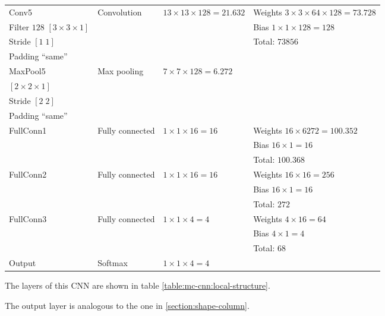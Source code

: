 \begin{table*}
\begin{tabular}{|l|l|l|l|}
                    Conv5 & Convolution & $13\times 13\times 128 = 21.632$ & Weights $3\times 3\times 64 \times 128 = 73.728$\\
                    Filter $128$ $\left[3\times 3\times 1\right]$ & & & Bias $1\times 1\times 128 = 128$\\
                    Stride $\left[1\;1\right]$ & & & Total: $73856$\\
                    Padding ``same'' & & & \\\hline
                    MaxPool5 & Max pooling & $7\times 7\times 128 = 6.272$ & \\
                    $\left[2\times 2\times 1\right]$ & & & \\
                    Stride $\left[2\;2\right]$ & & & \\
                    Padding ``same'' & & & \\\hline
                    FullConn1 & Fully connected & $1\times 1\times 16 = 16$ & Weights $16\times 6272 = 100.352$\\
                    & & & Bias $16\times 1 = 16$\\
                    & & & Total: $100.368$\\\hline
                    FullConn2 & Fully connected & $1\times 1\times 16 = 16$ & Weights $16\times 16 = 256$\\
                    & & & Bias $16\times 1 = 16$\\
                    & & & Total: $272$\\\hline
                    FullConn3 & Fully connected & $1\times 1\times 4 = 4$ & Weights $4\times 16 = 64$\\
                    & & & Bias $4\times 1 = 4$\\
                    & & & Total: $68$\\\hline
                    Output & Softmax & $1\times 1\times 4 = 4$ & \\
                \hline
            \end{tabular}
            \vspace{0.5cm}
            \caption{Local column CNN layers.}\label{table:mc-cnn:local-structure}
        \end{table*}
        \par{
            The layers of this CNN are shown in table \ref{table:mc-cnn:local-structure}.
        }
        \par{
            The output layer is analogous to the one in \ref{section:shape-column}.
        }

